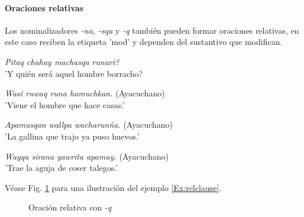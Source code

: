 \documentclass[a4paper,11pt,DIV12]{scrartcl}
\begin{document}
\paragraph{Oraciones relativas}\label{Sec:relclause}
Los nominalizadores {\em -na, -sqa} y {\em -q} tambi\'en pueden formar oraciones relativas, en este caso reciben la etiqueta 'mod' y dependen del sustantivo que modifican.

\begin{examples}
 \item {\em Pitaq chahay machasqa runari?}\\
      '{\textquestiondown}Y qui\'en ser\'a aquel hombre borracho?\\
 	\hfill{\small \citep[209-214]{Cusi2}}
 \item\label{Ex:relclause} {\em Wasi ruwaq runa hamuchkan.} (Ayacuchano)\\
      'Viene el hombre que hace casas.'
 \item {\em Apamusqan wallpa wacharun\~na.} (Ayacuchano)\\
      'La gallina que trajo ya puso huevos.'
\item {\em Wayqa sirana yawrita apamuy.} (Ayacuchano) \\
      'Trae la aguja de coser talegos.'\\
 	\hfill{\small \citep[153]{Soto76a}}
\end{examples}

V\'ease Fig. \ref{Fig:relclause} para una ilustraci\'on del ejemplo \ref{Ex:relclause}.

\begin{figure}
\begin{center}
\caption{Oraci\'on relativa con {\em -q}}\label{Fig:relclause}
\end{center}
\end{figure}
\end{document}
